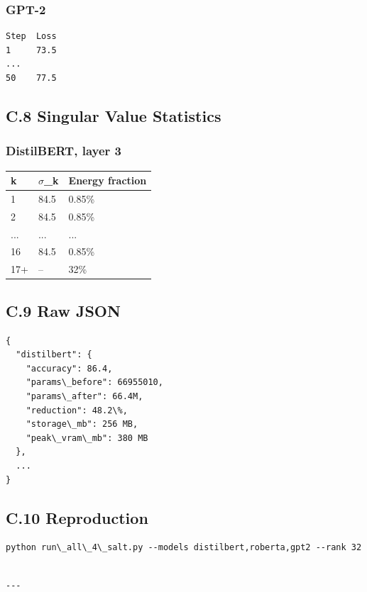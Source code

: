 \subsubsection{GPT-2}

\begin{lstlisting}
Step  Loss
1     73.5
...
50    77.5
\end{lstlisting}

\subsection{C.8 Singular Value Statistics}

\subsubsection{DistilBERT, layer 3}

\begin{table}[H]
\centering
\small
\begin{tabular}{lll}
\toprule
\textbf{k} & \textbf{$\sigma$\_k} & \textbf{Energy fraction} \\
\midrule
1 & 84.5 & 0.85\% \\
2 & 84.5 & 0.85\% \\
... & ... & ... \\
16 & 84.5 & 0.85\% \\
17+ & -- & 32\% \\
\bottomrule
\end{tabular}
\end{table}

\subsection{C.9 Raw JSON}

\begin{lstlisting}
{
  "distilbert": {
    "accuracy": 86.4,
    "params\_before": 66955010,
    "params\_after": 66.4M,
    "reduction": 48.2\%,
    "storage\_mb": 256 MB,
    "peak\_vram\_mb": 380 MB
  },
  ...
}
\end{lstlisting}

\subsection{C.10 Reproduction}

\begin{lstlisting}
python run\_all\_4\_salt.py --models distilbert,roberta,gpt2 --rank 32
\end{lstlisting}
\begin{lstlisting}

---
\end{lstlisting}

